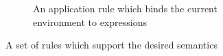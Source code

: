 \documentclass[11pt,oneside,a4paper]{report}
\begin{document}
\begin{figure}[ht]
\begin{mdframed}[style=bigbox]
\begin{subfigure}[b]{1\textwidth}
\begin{prooftree}
              \end{prooftree}   
          \caption{An application rule which binds the current environment to expressions}
          \label{fig:rules:freshenv:app}
        \end{subfigure}
    \end{mdframed}
    \caption{A set of rules which support the desired semantics}
    \label{fig:subrenam}
\end{figure}
\begin{figure}[ht]
\end{figure}

\end{document}
